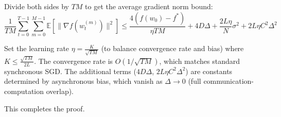 Divide both sides by $TM$ to get the average gradient norm bound:
\begin{equation}
\frac{1}{TM}\sum_{t=0}^{T-1}\sum_{m=0}^{M-1} \mathbb{E}\left[\|\nabla f(w_t^{(m)})\|^2\right] \leq \frac{4(f(w_0) - f^*)}{\eta TM} + 4 D \Delta + \frac{2 L \eta}{N}\sigma^2 + 2 L \eta C^2 \Delta^2
\end{equation}

Set the learning rate $\eta = \frac{K}{\sqrt{TM}}$ (to balance convergence rate and bias) where $K \leq \frac{\sqrt{TM}}{2L}$. The convergence rate is $O(1/\sqrt{TM})$, which matches standard synchronous SGD. The additional terms ($4D\Delta$, $2L\eta C^2\Delta^2$) are constants determined by asynchronous bias, which vanish as $\Delta \to 0$ (full communication-computation overlap).

This completes the proof.
\label{app:exp_details}